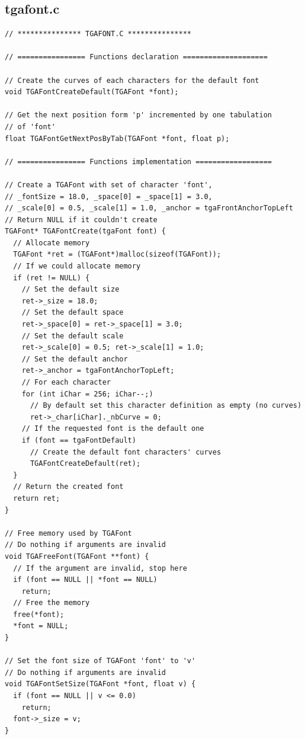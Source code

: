 \documentclass[12pt, a4paper]{article}
\begin{document}
\subsection{tgafont.c}

\begin{scriptsize}
\begin{ttfamily}
\begin{lstlisting}
// *************** TGAFONT.C ***************

// ================ Functions declaration ====================

// Create the curves of each characters for the default font
void TGAFontCreateDefault(TGAFont *font);

// Get the next position form 'p' incremented by one tabulation
// of 'font'
float TGAFontGetNextPosByTab(TGAFont *font, float p);

// ================ Functions implementation ==================

// Create a TGAFont with set of character 'font', 
// _fontSize = 18.0, _space[0] = _space[1] = 3.0, 
// _scale[0] = 0.5, _scale[1] = 1.0, _anchor = tgaFrontAnchorTopLeft
// Return NULL if it couldn't create
TGAFont* TGAFontCreate(tgaFont font) {
  // Allocate memory
  TGAFont *ret = (TGAFont*)malloc(sizeof(TGAFont));
  // If we could allocate memory
  if (ret != NULL) {
    // Set the default size
    ret->_size = 18.0;
    // Set the default space
    ret->_space[0] = ret->_space[1] = 3.0;
    // Set the default scale
    ret->_scale[0] = 0.5; ret->_scale[1] = 1.0;
    // Set the default anchor
    ret->_anchor = tgaFontAnchorTopLeft;
    // For each character
    for (int iChar = 256; iChar--;)
      // By default set this character definition as empty (no curves)
      ret->_char[iChar]._nbCurve = 0;
    // If the requested font is the default one
    if (font == tgaFontDefault)
      // Create the default font characters' curves
      TGAFontCreateDefault(ret);
  }
  // Return the created font
  return ret;
}

// Free memory used by TGAFont
// Do nothing if arguments are invalid
void TGAFreeFont(TGAFont **font) {
  // If the argument are invalid, stop here
  if (font == NULL || *font == NULL)
    return;
  // Free the memory
  free(*font);
  *font = NULL;
}

// Set the font size of TGAFont 'font' to 'v'
// Do nothing if arguments are invalid
void TGAFontSetSize(TGAFont *font, float v) {
  if (font == NULL || v <= 0.0)
    return;
  font->_size = v;
}


\end{lstlisting}
\end{ttfamily}
\end{scriptsize}
\end{document}
